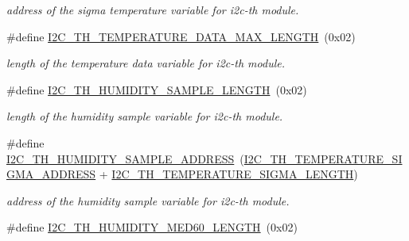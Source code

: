 \begin{DoxyCompactItemize}
\begin{DoxyCompactList}\small\item\em address of the sigma temperature variable for i2c-\/th module. \end{DoxyCompactList}\item 
\mbox{\label{registers-th_8h_a142a65f1eb8b87e05640583cf0f9d380}} 
\#define \hyperlink{registers-th_8h_a142a65f1eb8b87e05640583cf0f9d380}{I2\+C\+\_\+\+T\+H\+\_\+\+T\+E\+M\+P\+E\+R\+A\+T\+U\+R\+E\+\_\+\+D\+A\+T\+A\+\_\+\+M\+A\+X\+\_\+\+L\+E\+N\+G\+TH}~(0x02)
\begin{DoxyCompactList}\small\item\em length of the temperature data variable for i2c-\/th module. \end{DoxyCompactList}\item 
\mbox{\label{registers-th_8h_a65dca74d31862278a1846c21d23c844d}} 
\#define \hyperlink{registers-th_8h_a65dca74d31862278a1846c21d23c844d}{I2\+C\+\_\+\+T\+H\+\_\+\+H\+U\+M\+I\+D\+I\+T\+Y\+\_\+\+S\+A\+M\+P\+L\+E\+\_\+\+L\+E\+N\+G\+TH}~(0x02)
\begin{DoxyCompactList}\small\item\em length of the humidity sample variable for i2c-\/th module. \end{DoxyCompactList}\item 
\mbox{\label{registers-th_8h_a82d3a5a7a97efcf0b2aa503c0c6de2a5}} 
\#define \hyperlink{registers-th_8h_a82d3a5a7a97efcf0b2aa503c0c6de2a5}{I2\+C\+\_\+\+T\+H\+\_\+\+H\+U\+M\+I\+D\+I\+T\+Y\+\_\+\+S\+A\+M\+P\+L\+E\+\_\+\+A\+D\+D\+R\+E\+SS}~(\hyperlink{registers-th_8h_a13174bfc9826a2360b3a9ef42c682415}{I2\+C\+\_\+\+T\+H\+\_\+\+T\+E\+M\+P\+E\+R\+A\+T\+U\+R\+E\+\_\+\+S\+I\+G\+M\+A\+\_\+\+A\+D\+D\+R\+E\+SS} + \hyperlink{registers-th_8h_adb95f4cc071476c164346dc15de2dd1a}{I2\+C\+\_\+\+T\+H\+\_\+\+T\+E\+M\+P\+E\+R\+A\+T\+U\+R\+E\+\_\+\+S\+I\+G\+M\+A\+\_\+\+L\+E\+N\+G\+TH})
\begin{DoxyCompactList}\small\item\em address of the humidity sample variable for i2c-\/th module. \end{DoxyCompactList}\item 
\mbox{\label{registers-th_8h_a0a468dccdfa6ca2993e960b85661efa5}} 
\#define \hyperlink{registers-th_8h_a0a468dccdfa6ca2993e960b85661efa5}{I2\+C\+\_\+\+T\+H\+\_\+\+H\+U\+M\+I\+D\+I\+T\+Y\+\_\+\+M\+E\+D60\+\_\+\+L\+E\+N\+G\+TH}~(0x02)

\end{DoxyCompactItemize}
